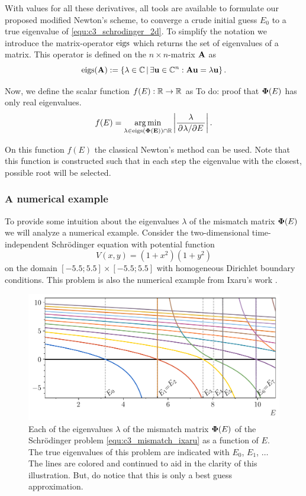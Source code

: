 With values for all these derivatives, all tools are available to formulate our proposed modified Newton's scheme, to converge a crude initial guess $E_0$ to a true eigenvalue of \eqref{equ:c3_schrodinger_2d}. To simplify the notation we introduce the matrix-operator $\operatorname{eigs}$ which returns the set of eigenvalues of a matrix. This operator is defined on the $n \times n$-matrix $\vb{A}$ as
$$
    \operatorname{eigs}(\vb{A}) := \left\{\lambda \in \mathbb{C} \, | \, \exists \vb{u} \in \mathbb{C}^n : \vb{A} \vb{u} = \lambda \vb{u} \right\}\text{.}
$$

Now, we define the scalar function $f(E) : \mathbb{R} \to \mathbb{R}$ as {\color{red}To do: proof that $\vb{\Phi}(E)$ has only real eigenvalues.}
\begin{equation}\label{equ:c3_mismatch_newton_function}
    f(E) = \operatorname*{arg\,min}_{\lambda \in \operatorname{eigs}(\vb{\Phi(E)}) \cap \mathbb{R}} \left|\frac{\lambda}{\pdv*[]{\lambda}{E}}\right|\text{.}
\end{equation}

On this function $f(E)$ the classical Newton's method can be used. Note that this function is constructed such that in each step the eigenvalue with the closest, possible root will be selected.

\subsubsection{A numerical example}

To provide some intuition about the eigenvalues $\lambda$ of the mismatch matrix $\vb{\Phi}(E)$ we will analyze a numerical example. Consider the two-dimensional time-independent Schrödinger equation with potential function
\begin{equation}\label{equ:c3_mismatch_ixaru}
    V(x, y) = (1+x^2)(1+y^2)
\end{equation}
on the domain $[-5.5; 5.5] \times [-5.5; 5.5]$ with homogeneous Dirichlet boundary conditions. This problem is also the numerical example from Ixaru's work \cite{ixaru_new_2010}.

\begin{figure}
    \centering
    \includegraphics[width=\textwidth]{img/chapter3/mismatch_rainbow.pdf}
    \caption{\label{fig:c3_mismatch_rainbow} Each of the eigenvalues $\lambda$ of the mismatch matrix $\vb{\Phi}(E)$ of the Schrödinger problem \eqref{equ:c3_mismatch_ixaru} as a function of $E$. The true eigenvalues of this problem are indicated with $E_0$, $E_1$, $\dots$ The lines are colored and continued to aid in the clarity of this illustration. But, do notice that this is only a best guess approximation.}
\end{figure}

